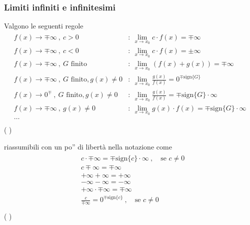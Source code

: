 \documentclass[letterpaper,10pt,italian]{jupyterBook}
\begin{document}
\subsubsection{Limiti infiniti e infinitesimi}
\label{\detokenize{ch/infinitesimal_calculus/analysis:limiti-infiniti-e-infinitesimi}}\label{\detokenize{ch/infinitesimal_calculus/analysis:infinitesimal-calculus-limits-thms-infinite-simal}}
\sphinxAtStartPar
Valgono le seguenti regole
\begin{equation*}
\begin{split}\begin{array}{ll}
  f(x) \rightarrow \mp \infty \ , \ c > 0             & : \ \lim_{x \rightarrow x_0} c \cdot f(x) = \mp \infty \\
  f(x) \rightarrow \mp \infty \ , \ c < 0             & : \ \lim_{x \rightarrow x_0} c \cdot f(x) = \pm \infty \\
  f(x) \rightarrow \mp \infty \ , \ G \text{ finito}  & : \ \lim_{x \rightarrow x_0} ( f(x) + g(x) ) = \mp \infty \\
  f(x) \rightarrow \mp \infty \ , \ G \text{ finito}, g(x) \ne 0  & : \ \lim_{x \rightarrow x_0} \frac{g(x)}{f(x)} = 0^{ \mp \text{sign}\{G\}} \\
  f(x) \rightarrow 0^{\mp}    \ , \ G \text{ finito}, g(x) \ne 0  & : \ \lim_{x \rightarrow x_0} \frac{g(x)}{f(x)} = \mp \text{sign}\{G\} \cdot \infty \\
  f(x) \rightarrow \mp \infty \ , \ g(x) \ne 0 & : \ \lim_{x \rightarrow x_0} g(x) \cdot f(x) = \mp \text{sign}\{G\} \cdot \infty \\
  \dots & \\
\end{array}\end{split}
\end{equation*}
\sphinxAtStartPar
( )

\sphinxAtStartPar
riassumibili con un po” di libertà nella notazione come
\begin{equation*}
\begin{split}\begin{aligned}
  & c \cdot \mp \infty = \mp \text{sign}\{c\} \cdot \infty \ , \quad \text{se } c \ne 0 \\
  & c \mp \infty = \mp \infty \\
  & + \infty + \infty = +\infty \\
  & - \infty - \infty = -\infty \\
  & + \infty \cdot \mp \infty = \mp \infty \\
  & \frac{c}{\mp \infty} = 0^{\mp \text{sign}\{c\}} \ , \quad \text{se } c \ne 0 \\
\end{aligned}\end{split}
\end{equation*}
\sphinxAtStartPar
( )
\end{document}
